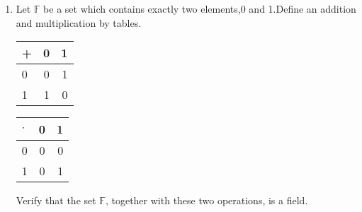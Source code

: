 \renewcommand{\theequation}{\theenumi}
\renewcommand{\thefigure}{\theenumi}
\begin{enumerate}[label=\thesection.\arabic*.,ref=\thesection.\theenumi]
%
\item Let $\mathbb{F}$ be a set which contains exactly two elements,0 and 1.Define an addition and multiplication by tables.
\begin{table}[h!]
  \begin{center}
    \label{eq:solutions/1/1/5/tab:table1}
    \begin{tabular}{l|c|r}
      + & 0 & 1 \\
      \hline
      0 & 0 & 1\\
      1 & 1 & 0
    \end{tabular}
  \end{center}
\end{table}
\begin{table}[h!]
  \begin{center}
    \label{eq:solutions/1/1/5/tab:table2}
    \begin{tabular}{l|c|r}
      $\cdot$ & 0 & 1 \\
      \hline
      0 & 0 & 0\\
      1 & 0 & 1
    \end{tabular}
  \end{center}
\end{table}
  Verify that the set $\mathbb{F}$, together with these two operations, is a field.
%
\\
\solution

\end{enumerate}


